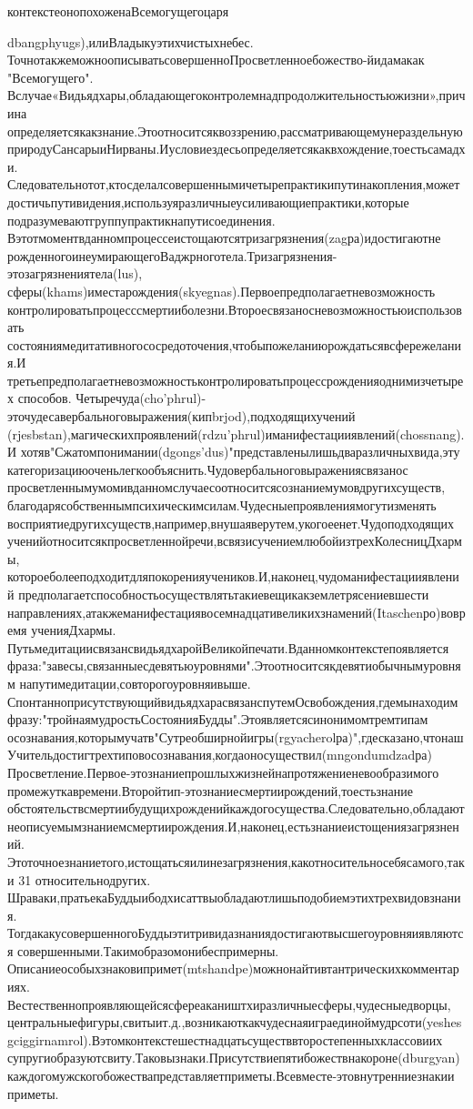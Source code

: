 контекстеонопохоженаВсемогущегоцаря{dbangphyugs),илиВладыкуэтихчистыхнебес.
ТочнотакжеможноописыватьсовершенноПросветленноебожество-йидамакак
"Всемогущего".
Вслучае«Видьядхары,обладающегоконтролемнадпродолжительностьюжизни»,причина
определяетсякакзнание.Этоотноситсяквоззрению,рассматривающемунераздельную
природуСансарыиНирваны.Иусловиездесьопределяетсякаквхождение,тоестьсамадхи.
Следовательнотот,ктосделалсовершеннымичетырепрактикипутинакопления,может
достичьпутивидения,используяразличныеусиливающиепрактики,которые
подразумеваютгруппупрактикнапутисоединения.
Вэтотмоментвданномпроцессеистощаютсятризагрязнения(zagра)идостигаютне
рожденногоинеумирающегоВаджрноготела.Тризагрязнения-этозагрязнениятела(lus),
сферы(khams)иместарождения(skyegnas).Первоепредполагаетневозможность
контролироватьпроцесссмертииболезни.Второесвязаносневозможностьюиспользовать
состояниямедитативногососредоточения,чтобыпожеланиюрождатьсявсфережелания.И
третьепредполагаетневозможностьконтролироватьпроцессрожденияоднимизчетырех
способов.
Четыречуда(cho'phrul)-эточудесавербальноговыражения(кипbrjod),подходящихучений
(rjesbstan),магическихпроявлений(rdzu'phrul)иманифестацииявлений(chossnang).И
хотяв"Сжатомпонимании(dgongs'dus)"представленылишьдваразличныхвида,эту
категоризациюоченьлегкообъяснить.Чудовербальноговыражениясвязанос
просветленнымумомивданномслучаесоотноситсясознаниемумовдругихсуществ,
благодарясобственнымпсихическимсилам.Чудесныепроявлениямогутизменять
восприятиедругихсуществ,например,внушаяверутем,укогоеенет.Чудоподходящих
ученийотноситсякпросветленнойречи,всвязисучениемлюбойизтрехКолесницДхармы,
котороеболееподходитдляпокоренияучеников.И,наконец,чудоманифестацииявлений
предполагаетспособностьосуществлятьтакиевещикакземлетрясениевшести
направлениях,атакжеманифестациявосемнадцативеликихзнамений(Itaschenро)вовремя
ученияДхармы.
ПутьмедитациисвязансвидьядхаройВеликойпечати.Вданномконтекстепоявляется
фраза:"завесы,связанныесдевятьюуровнями".Этоотноситсякдевятиобычнымуровням
напутимедитации,совторогоуровняивыше.
СпонтанноприсутствующийвидьядхарасвязанспутемОсвобождения,гдемынаходим
фразу:"тройнаямудростьСостоянияБудды".Этоявляетсясинонимомтремтипам
осознавания,которымучатв"Сутреобширнойигры(rgyacherolра)",гдесказано,чтонаш
Учительдостигтрехтиповосознавания,когдаоносуществил(mngondumdzadра)
Просветление.Первое-этознаниепрошлыхжизнейнапротяжениеневообразимого
промежуткавремени.Второйтип-этознаниесмертиирождений,тоестьзнание
обстоятельствсмертиибудущихрожденийкаждогосущества.Следовательно,обладают
неописуемымзнаниемсмертиирождения.И,наконец,естьзнаниеистощениязагрязнений.
Этоточноезнаниетого,истощатьсяилинезагрязнения,какотносительносебясамого,таки
31
относительнодругих.
Шраваки,пратьекаБуддыибодхисаттвыобладаютлишьподобиемэтихтрехвидовзнания.
ТогдакакусовершенногоБуддыэтитривидазнаниядостигаютвысшегоуровняиявляются
совершенными.Такимобразомонибеспримерны.
Описаниеособыхзнаковипримет(mtshandpe)можнонайтивтантрическихкомментариях.
Вестественнопроявляющейсясфереакаништхиразличныесферы,чудесныедворцы,
центральныефигуры,свитыит.д.,возникаюткакчудеснаяиграединоймудрсоти(yeshes
gciggirnamrol).Вэтомконтекстешестнадцатьсуществвторостепенныхклассовиих
супругиобразуютсвиту.Таковызнаки.Присутствиепятибожествнакороне(dburgyan)
каждогомужскогобожествапредставляетприметы.Всевместе-этовнутренниезнакии
приметы.

}
